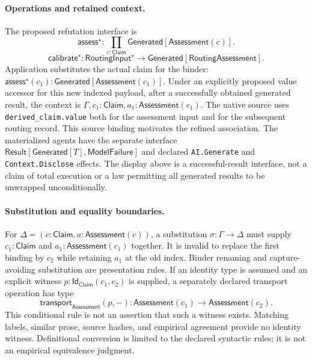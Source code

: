 \paragraph{Operations and retained context.}
The proposed refutation interface is
\[
 \mathsf{assess}^{\star}:\prod_{c:\mathsf{Claim}}
             \mathsf{Generated}[\mathsf{Assessment}(c)].
\]
\[
 \mathsf{calibrate}^{\star}:\mathsf{RoutingInput}^{\star}\to
             \mathsf{Generated}[\mathsf{RoutingAssessment}].
\]
Application substitutes the actual claim for the binder:
$\mathsf{assess}^{\star}(c_1):
\mathsf{Generated}[\mathsf{Assessment}(c_1)]$.
Under an explicitly proposed value accessor for this new indexed payload, after a successfully obtained generated result,
the context is
$\Gamma,c_1:\mathsf{Claim},a_1:\mathsf{Assessment}(c_1)$.
The native source uses \texttt{derived\_claim.value} both for the assessment
input and for the subsequent routing record. This source binding motivates
the refined association. The materialized agents have the separate interface
$\mathsf{Result}[\mathsf{Generated}[T],\mathsf{ModelFailure}]$ and declared
\texttt{AI.Generate} and \texttt{Context.Disclose} effects. The display above
is a successful-result interface, not a claim of total execution or a law
permitting all generated results to be unwrapped unconditionally.

\paragraph{Substitution and equality boundaries.}
For $\Delta=(c:\mathsf{Claim},a:\mathsf{Assessment}(c))$, a substitution
$\sigma:\Gamma\to\Delta$ must supply $c_1:\mathsf{Claim}$ and
$a_1:\mathsf{Assessment}(c_1)$ together. It is invalid to replace the first
binding by $c_2$ while retaining $a_1$ at the old index. Binder renaming and
capture-avoiding substitution are presentation rules. If an identity type is
assumed and an explicit witness
$p:\mathsf{Id}_{\mathsf{Claim}}(c_1,c_2)$ is supplied, a separately declared
transport operation has type
\[
 \mathsf{transport}_{\mathsf{Assessment}}(p,-):
 \mathsf{Assessment}(c_1)\to\mathsf{Assessment}(c_2).
\]
This conditional rule is not an assertion that such a witness exists.
Matching labels, similar prose, source hashes, and empirical agreement provide
no identity witness. Definitional conversion is limited to the declared
syntactic rules; it is not an empirical equivalence judgment.

